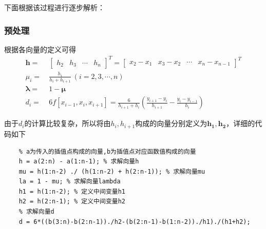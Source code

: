 \documentclass[12pt, a4paper, oneside]{ctexart}
\begin{document}
下面根据该过程进行逐步解析：
\subsubsection{预处理}\label{subsubsec:yuchuli}
根据各向量的定义可得
\begin{equation*}
    \begin{aligned}
        \boldsymbol{h}=&\ \left[\begin{matrix}
            h_2&h_3&\cdots&h_n
        \end{matrix}\right]^T=\left[\begin{matrix}
            x_2-x_1&x_3-x_2&\cdots&x_n-x_{n-1}
        \end{matrix}\right]^T\\
        \mu_i =&\ \frac{h_i}{h_i+h_{i+1}}\ (i=2,3,\cdots, n)\\
        \boldsymbol{\lambda} =&\ 1-\boldsymbol{\mu}\\
        d_i =&\ 6f[x_{i-1},x_i,x_{i+1}]=\frac{6}{h_{i+1}+h_i}\left(\frac{y_{i+1}-y_i}{h_{i+1}}-\frac{y_i-y_{i-1}}{h_i}\right)
    \end{aligned}
\end{equation*}

由于$d_i$的计算比较复杂，所以将由$h_i,h_{i+1}$构成的向量分别定义为$\boldsymbol{h_1},\boldsymbol{h_2}$，详细的代码如下
\begin{lstlisting}
    % a为传入的插值点构成的向量,b为插值点对应函数值构成的向量
    h = a(2:n) - a(1:n-1); % 求解向量h
    mu = h(1:n-2) ./ (h(1:n-2) + h(2:n-1)); % 求解向量mu
    la = 1 - mu; % 求解向量lambda
    h1 = h(1:n-2); % 定义中间变量h1
    h2 = h(2:n-1); % 定义中间变量h2
    % 求解向量d
    d = 6*((b(3:n)-b(2:n-1))./h2-(b(2:n-1)-b(1:n-2))./h1)./(h1+h2);
\end{lstlisting}
\end{document}
